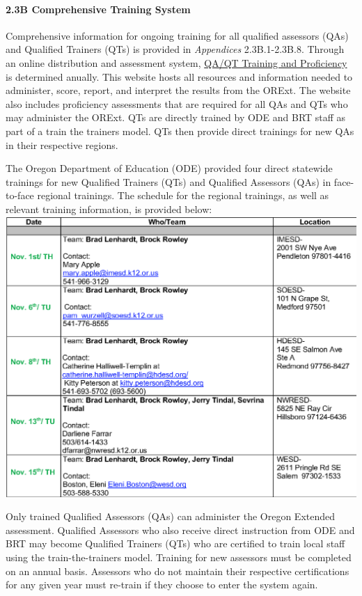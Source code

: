 \documentclass[]{article}
\let\oldparagraph\paragraph
\renewcommand{\paragraph}[1]{\oldparagraph{#1}\mbox{}}
\begin{document}
\hypertarget{b-comprehensive-training-system}{%
\paragraph{2.3B Comprehensive Training
System}\label{b-comprehensive-training-system}}

Comprehensive information for ongoing training for all qualified
assessors (QAs) and Qualified Trainers (QTs) is provided in
\emph{Appendices} 2.3B.1-2.3B.8. Through an online distribution and
assessment system, \color{link}\href{https://or.k12test.com/}{QA/QT
Training and Proficiency} \color{black} is determined anually. This
website hosts all resources and information needed to administer, score,
report, and interpret the results from the ORExt. The website also
includes proficiency assessments that are required for all QAs and QTs
who may administer the ORExt. QTs are directly trained by ODE and BRT
staff as part of a train the trainers model. QTs then provide direct
trainings for new QAs in their respective regions.

The Oregon Department of Education (ODE) provided four direct statewide
trainings for new Qualified Trainers (QTs) and Qualified Assessors (QAs)
in face-to-face regional trainings. The schedule for the regional
trainings, as well as relevant training information, is provided below:
\FloatBarrier
\includegraphics{Figures/TrainingSched/2018_19_TrainingSchedule.png}

Only trained Qualified Assessors (QAs) can administer the Oregon
Extended assessment. Qualified Assessors who also receive direct
instruction from ODE and BRT may become Qualified Trainers (QTs) who are
certified to train local staff using the train-the-trainers model.
Training for new assessors must be completed on an annual basis.
Assessors who do not maintain their respective certifications for any
given year must re-train if they choose to enter the system again.
\end{document}

